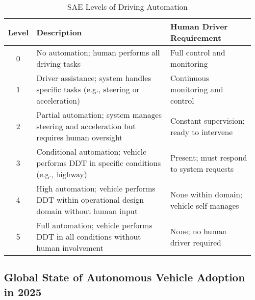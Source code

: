 \begin{table}[h]
\centering
\caption{SAE Levels of Driving Automation}
\begin{tabular}{|c|p{6cm}|p{6cm}|}
\hline
\textbf{Level} & \textbf{Description} & \textbf{Human Driver Requirement} \\
\hline
0 & No automation; human performs all driving tasks & Full control and monitoring \\
\hline
1 & Driver assistance; system handles specific tasks (e.g., steering or acceleration) & Continuous monitoring and control \\
\hline
2 & Partial automation; system manages steering and acceleration but requires human oversight & Constant supervision; ready to intervene \\
\hline
3 & Conditional automation; vehicle performs DDT in specific conditions (e.g., highway) & Present; must respond to system requests \\
\hline
4 & High automation; vehicle performs DDT within operational design domain without human input & None within domain; vehicle self-manages \\
\hline
5 & Full automation; vehicle performs DDT in all conditions without human involvement & None; no human driver required \\
\hline
\end{tabular}
\end{table}

\subsection{Global State of Autonomous Vehicle Adoption in 2025}


